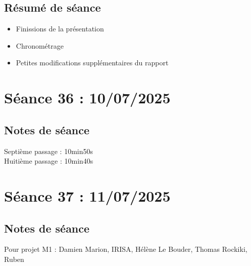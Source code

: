 \documentclass[12pt]{article}
\begin{document}
	\subsection{Résumé de séance}
	\begin{itemize}
		\item Finissions de la présentation
		\item Chronométrage
		\item Petites modifications supplémentaires du rapport
	\end{itemize}
	
	
	\section{Séance 36 : 10/07/2025}
	\subsection{Notes de séance}
	Septième passage : 10min50s\\
	Huitième passage : 10min40s\\
	
	\section{Séance 37 : 11/07/2025}
	\subsection{Notes de séance}
	Pour projet M1 :
	Damien Marion, IRISA, Hélène Le Bouder, Thomas Rockiki, Ruben
	
\end{document}
